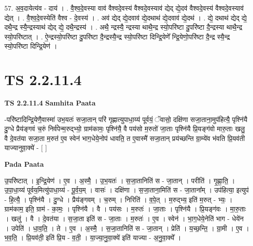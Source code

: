 \documentclass[17pt]{extarticle}
\begin{document}
57. अ॒व॒दायेत्य॑व - दाय॑ । . वै॒श्व॒दे॒वस्या वाव॑ वैश्वदे॒वस्य॑ वैश्वदे॒वस्याव॑ द्येद् द्ये॒दव॑ वैश्वदे॒वस्य॑ वैश्वदे॒वस्याव॑ द्येत् । . वै॒श्व॒दे॒वस्येति॑ वैश्व - दे॒वस्य॑ । . अव॑ द्येद् द्ये॒दवाव॑ द्ये॒दथाथ॑ द्ये॒दवाव॑ द्ये॒दथ॑ । . द्ये॒ दथाथ॑ द्येद् द्ये॒ दथै॒न्द्र स्यै॒न्द्रस्याथ॑ द्येद् द्ये॒ दथै॒न्द्रस्य॑ । . अथै॒ न्द्रस्यै॒ न्द्रस्या थाथै॒न्द्र स्यो॒परि॑ष्टा दु॒परि॑ष्टा दै॒न्द्रस्या थाथै॒न्द्र स्यो॒परि॑ष्टात् । . ऐ॒न्द्रस्यो॒परि॑ष्टा दु॒परि॑ष्टा दै॒न्द्रस्यै॒न्द्र स्यो॒परि॑ष्टा दिन्द्रि॒येणे᳚ न्द्रि॒येणो॒परि॑ष्टा 
दै॒न्द्र स्यै॒न्द्र स्यो॒परि॑ष्टा दिन्द्रि॒येण॑ । \newline
\pagebreak
{}

\section{ TS 2.2.11.4 }

\textbf{TS 2.2.11.4 } \newline
\textbf{Samhita Paata} \newline

-परि॑ष्टादिन्द्रि॒येणै॒वास्मा॑ उभ॒यतः॑ सजा॒तान् परि॑ गृह्णात्युपाधा॒य्य॑ पूर्वयं॒ ॅवासो॒ दक्षि॑णा सजा॒ताना॒मुप॑हित्यै॒ पृश्नि॑यै दु॒ग्धे प्रैय॑ङ्गवं च॒रुं निर्व॑पेन्म॒रुद्भ्यो॒ ग्राम॑कामः॒ पृश्नि॑यै॒ वै पय॑सो म॒रुतो॑ जा॒ताः पृश्नि॑यै प्रि॒यङ्ग॑वो मारु॒ताः खलु॒ वै दे॒वत॑या सजा॒ता म॒रुत॑ ए॒व स्वेन॑ भाग॒धेये॒नोप॑ धावति॒ त ए॒वास्मै॑ सजा॒तान् प्रय॑च्छन्ति ग्रा॒म्ये॑व भ॑वति प्रि॒यव॑ती याज्यानुवा॒क्ये॑ - [  ] \newline

\textbf{Pada Paata} \newline

उ॒परि॑ष्टात् । इ॒न्द्रि॒येण॑ । ए॒व । अ॒स्मै॒ । उ॒भ॒यतः॑ । स॒जा॒तानिति॑ स - जा॒तान् । परीति॑ । गृ॒ह्णा॒ति॒ । उ॒पा॒धा॒य्य॑ पूर्वय॒मित्यु॑पाधा॒य्य॑ - पू॒र्व॒य॒म् । वासः॑ । दक्षि॑णा । स॒जा॒ताना॒मिति॑ स - जा॒ताना᳚म् । उप॑हित्या॒ इत्युप॑ - हि॒त्यै॒ । पृश्नि॑यै । दु॒ग्धे । प्रैय॑ङ्गवम् । च॒रुम् । निरिति॑ । व॒पे॒त् । म॒रुद्भ्य॒ इति॑ म॒रुत् - भ्यः॒ । ग्राम॑काम॒ इति॒ ग्राम॑ - का॒मः॒ । पृश्नि॑यै । वै । पय॑सः । म॒रुतः॑ । जा॒ताः । पृश्नि॑यै । प्रि॒यङ्ग॑वः । मा॒रु॒ताः । खलु॑ । वै । दे॒वत॑या । स॒जा॒ता इति॑ स - जा॒ताः । म॒रुतः॑ । ए॒व । स्वेन॑ । भा॒ग॒धेये॒नेति॑ भाग - धेये॑न । उपेति॑ । धा॒व॒ति॒ । ते । ए॒व । अ॒स्मै॒ । स॒जा॒तानिति॑ स - जा॒तान् । प्रेति॑ । य॒च्छ॒न्ति॒ । ग्रा॒मी । ए॒व । भ॒व॒ति॒ । प्रि॒यव॑ती॒ इति॑ प्रि॒य - व॒ती॒ । या॒ज्या॒नु॒वा॒क्ये॑ इति॑ याज्या - अ॒नु॒वा॒क्ये᳚ ।  \newline
\end{document}
